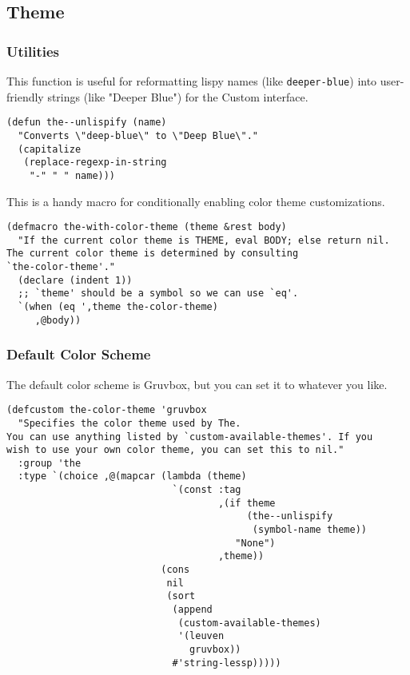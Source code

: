 \documentclass[11pt]{article}
\begin{document}
\subsection{Theme}
\label{sec:org8cbdfdd}
\subsubsection{Utilities}
\label{sec:org36e19b3}

This function is useful for reformatting lispy names (like
\texttt{deeper-blue}) into user-friendly strings (like "Deeper Blue") for
the Custom interface.
\begin{verbatim}
(defun the--unlispify (name)
  "Converts \"deep-blue\" to \"Deep Blue\"."
  (capitalize
   (replace-regexp-in-string
    "-" " " name)))
\end{verbatim}

This is a handy macro for conditionally enabling color theme
customizations.
\begin{verbatim}
(defmacro the-with-color-theme (theme &rest body)
  "If the current color theme is THEME, eval BODY; else return nil.
The current color theme is determined by consulting
`the-color-theme'."
  (declare (indent 1))
  ;; `theme' should be a symbol so we can use `eq'.
  `(when (eq ',theme the-color-theme)
     ,@body))
\end{verbatim}

\subsubsection{Default Color Scheme}
\label{sec:orgb5d6863}

The default color scheme is Gruvbox, but you can set it to whatever
you like.

\begin{verbatim}
(defcustom the-color-theme 'gruvbox
  "Specifies the color theme used by The.
You can use anything listed by `custom-available-themes'. If you
wish to use your own color theme, you can set this to nil."
  :group 'the
  :type `(choice ,@(mapcar (lambda (theme)
                             `(const :tag
                                     ,(if theme
                                          (the--unlispify
                                           (symbol-name theme))
                                        "None")
                                     ,theme))
                           (cons
                            nil
                            (sort
                             (append
                              (custom-available-themes)
                              '(leuven
                                gruvbox))
                             #'string-lessp)))))
\end{verbatim}
\end{document}
